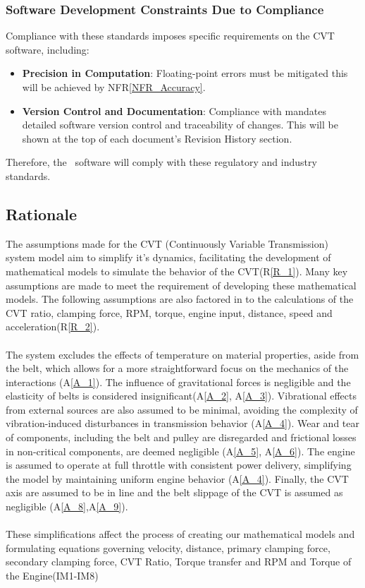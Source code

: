 \documentclass[12pt]{article}
\newcommand{\aref}[1]{A\ref{#1}}
\newcommand{\rref}[1]{R\ref{#1}}
\begin{document}
\subsubsection{Software Development Constraints Due to Compliance}
Compliance with these standards imposes specific requirements on the CVT software, including:
\begin{itemize}
    \item \textbf{Precision in Computation}: Floating-point errors must be mitigated this will be achieved by NF\rref{NFR_Accuracy}.
    \item \textbf{Version Control and Documentation}: Compliance with \cite{ISO26262Standard} mandates detailed software version control and traceability of changes. This will be shown at the top of each document's Revision History section. 
\end{itemize}

\noindent Therefore, the \progname \ software will comply with these regulatory and industry standards.


\subsection{Rationale}

The assumptions made for the CVT (Continuously Variable Transmission) system model aim to simplify it's dynamics, facilitating the development of mathematical models to simulate the behavior of the CVT(\rref{R_1}). 
Many key assumptions are made to meet the requirement of developing these mathematical models. The following assumptions are also factored in to the calculations of the CVT ratio, clamping force, RPM, torque, engine input, distance, speed and acceleration(\rref{R_2}). 
\\\\
\noindent The system excludes the effects of temperature on material properties, aside from the belt, which allows for a more straightforward focus on the mechanics of the interactions (\aref{A_1}).
The influence of gravitational forces is negligible and the elasticity of belts is considered insignificant(\aref{A_2}, \aref{A_3}). 
Vibrational effects from external sources are also assumed to be minimal, avoiding the complexity of vibration-induced disturbances in transmission behavior (\aref{A_4}).
Wear and tear of components, including the belt and pulley are disregarded and frictional losses in non-critical components, are deemed negligible (\aref{A_5}, \aref{A_6}). 
The engine is assumed to operate at full throttle with consistent power delivery, simplifying the model by maintaining uniform engine behavior (\aref{A_4}).
Finally, the CVT axis are assumed to be in line and the belt slippage of the CVT is assumed as negligible (\aref{A_8},\aref{A_9}). 
\\\\
\noindent These simplifications affect the process of creating our mathematical models and formulating equations governing velocity, distance, primary clamping force, secondary clamping force, CVT Ratio, Torque transfer and RPM and Torque of the Engine(IM1-IM8)
\end{document}

